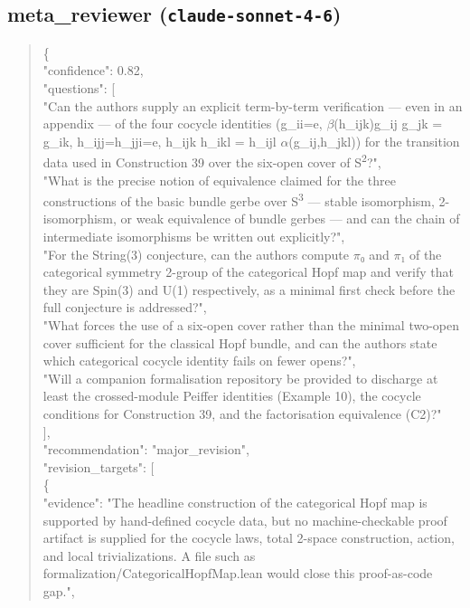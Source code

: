 \documentclass[11pt]{article}
\begin{document}
\subsection*{meta\_reviewer (\texttt{claude-sonnet-4-6})}
\begin{quote}\small\ttfamily\raggedright
\{\\
  "confidence": 0.82,\\
  "questions": [\\
    "Can the authors supply an explicit term-by-term verification --- even in an appendix --- of the four cocycle identities (g\_ii=e, \ensuremath{\beta}(h\_ijk)g\_ij g\_jk = g\_ik, h\_ijj=h\_jji=e, h\_ijk h\_ikl = h\_ijl \ensuremath{\alpha}(g\_ij,h\_jkl)) for the transition data used in Construction 39 over the six-open cover of S\textsuperscript{2}?",\\
    "What is the precise notion of equivalence claimed for the three constructions of the basic bundle gerbe over S\textsuperscript{3} --- stable isomorphism, 2-isomorphism, or weak equivalence of bundle gerbes --- and can the chain of intermediate isomorphisms be written out explicitly?",\\
    "For the String(3) conjecture, can the authors compute \ensuremath{\pi}₀ and \ensuremath{\pi}₁ of the categorical symmetry 2-group of the categorical Hopf map and verify that they are Spin(3) and U(1) respectively, as a minimal first check before the full conjecture is addressed?",\\
    "What forces the use of a six-open cover rather than the minimal two-open cover sufficient for the classical Hopf bundle, and can the authors state which categorical cocycle identity fails on fewer opens?",\\
    "Will a companion formalisation repository be provided to discharge at least the crossed-module Peiffer identities (Example 10), the cocycle conditions for Construction 39, and the factorisation equivalence (C2)?"\\
  ],\\
  "recommendation": "major\_revision",\\
  "revision\_targets": [\\
    \{\\
      "evidence": "The headline construction of the categorical Hopf map is supported by hand-defined cocycle data, but no machine-checkable proof artifact is supplied for the cocycle laws, total 2-space construction, action, and local trivializations. A file such as formalization/CategoricalHopfMap.lean would close this proof-as-code gap.",\\

\end{quote}
\end{document}
